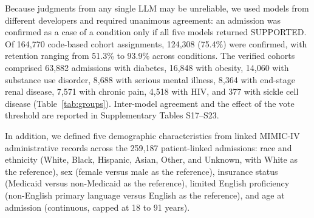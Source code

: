 \documentclass[unnumsec,webpdf,contemporary,large]{oup-authoring-template}
\newcommand{\td}[1]{\sethlcolor{pink}\hl{[Ting: #1]}}
\begin{document}
Because judgments from any single LLM may be unreliable, we used models from different developers and required unanimous agreement: an admission was confirmed as a case of a condition only if all five models returned SUPPORTED. 
Of 164,770 code-based cohort assignments, 124,308 (75.4\%) were confirmed, with retention ranging from 51.3\% to 93.9\% across conditions. The verified cohorts comprised 63,882 admissions with diabetes, 16,848 with obesity, 14,060 with substance use disorder, 8,688 with serious mental illness, 8,364 with end-stage renal disease, 7,571 with chronic pain, 4,518 with HIV, and 377 with sickle cell disease (Table~\ref{tab:groups}). Inter-model agreement and the effect of the vote threshold are reported in Supplementary Tables S17--S23.

In addition, we defined five demographic characteristics from linked MIMIC-IV administrative records across the 259,187 patient-linked admissions: race and ethnicity (White, Black, Hispanic, Asian, Other, and Unknown, with White as the reference), sex (female versus male as the reference), insurance status (Medicaid versus non-Medicaid as the reference), limited English proficiency (non-English primary language versus English as the reference), and age at admission (continuous, capped at 18 to 91 years).


\end{document}
